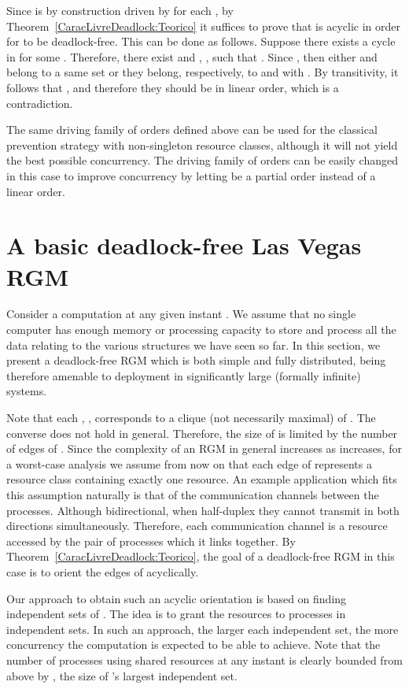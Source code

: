 \documentclass{article}
\begin{document}
Since  is by construction driven by  for each
, by Theorem~\ref{CaracLivreDeadlock:Teorico} it suffices to
prove that  is acyclic in order for  to be
deadlock-free. This can be done as follows. Suppose there exists a cycle in
 for some . Therefore, there exist
 and , ,
such that
.
Since , then either  and  belong to a same set
 or they belong, respectively, to  and  with
. By transitivity, it follows that ,
and therefore they should be in linear order, which is a contradiction. 

The same driving family of orders defined above can be used for the classical
prevention strategy with non-singleton resource classes, although it will not
yield the best possible concurrency. The driving family of orders can be easily
changed in this case to improve concurrency by letting  be a partial
order instead of a linear order.

\section{A basic deadlock-free Las Vegas RGM}

Consider a computation at any given instant . We assume that no
single computer has enough memory or processing capacity to store and process
all the data relating to the various structures we have seen so far. In this
section, we present a deadlock-free RGM which is both simple and fully
distributed, being therefore amenable to deployment in significantly large
(formally infinite) systems. 

Note that each , , corresponds to a clique (not necessarily
maximal) of . The converse does not hold in general. Therefore, the size of
 is limited by the number of edges of . Since the complexity of an RGM in
general increases as  increases, for a worst-case analysis we assume from
now on that each edge of  represents a resource class containing exactly one
resource. An example application which fits this assumption naturally is that of
the communication channels between the processes. Although bidirectional, when
half-duplex they cannot transmit in both directions simultaneously. Therefore,
each communication channel is a resource accessed by the pair of processes which
it links together. By Theorem~\ref{CaracLivreDeadlock:Teorico}, the goal of a
deadlock-free RGM in this case is to orient the edges of  acyclically.

Our approach to obtain such an acyclic orientation is based on finding
independent sets of . The idea is to grant the resources to processes in
independent sets. In such an approach, the larger each independent set, the more
concurrency the computation is expected to be able to achieve. Note that the
number of processes using shared resources at any instant is clearly bounded
from above by , the size of 's largest independent set. 
\end{document}
